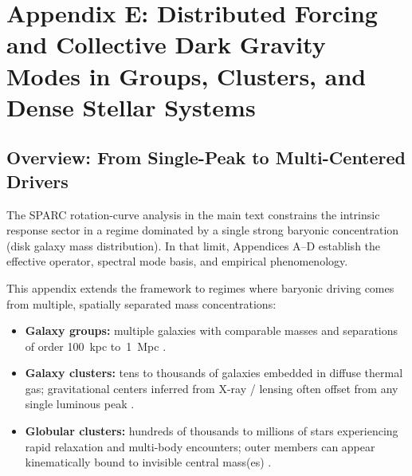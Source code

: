 \documentclass[11pt]{article}
\begin{document}

\section{Appendix E: Distributed Forcing and Collective Dark Gravity Modes in  
Groups, Clusters, and Dense Stellar Systems}\label{appendix-e-distributed-forcing}

\subsection{Overview: From Single-Peak to Multi-Centered Drivers}\label{e.1-overview}

The SPARC rotation-curve analysis in the main text constrains the intrinsic response 
sector in a regime dominated by a single strong baryonic concentration (disk galaxy mass 
distribution). In that limit, Appendices A--D establish the effective operator, spectral 
mode basis, and empirical phenomenology.

This appendix extends the framework to regimes where baryonic driving comes from 
multiple, spatially separated mass concentrations:
\begin{itemize}
  \item \textbf{Galaxy groups:} multiple galaxies with comparable masses and separations 
    of order 100~kpc to~1~Mpc \citep{Bullock2017}.
  \item \textbf{Galaxy clusters:} tens to thousands of galaxies embedded in diffuse 
    thermal gas; gravitational centers inferred from X-ray / lensing often offset from 
    any single luminous peak \citep{Clowe2006, MAST2019}.
  \item \textbf{Globular clusters:} hundreds of thousands to millions of stars 
    experiencing rapid relaxation and multi-body encounters; outer members can appear 
    kinematically bound to invisible central mass(es) \citep{Bullock2017}.
\end{itemize}
\end{document}
